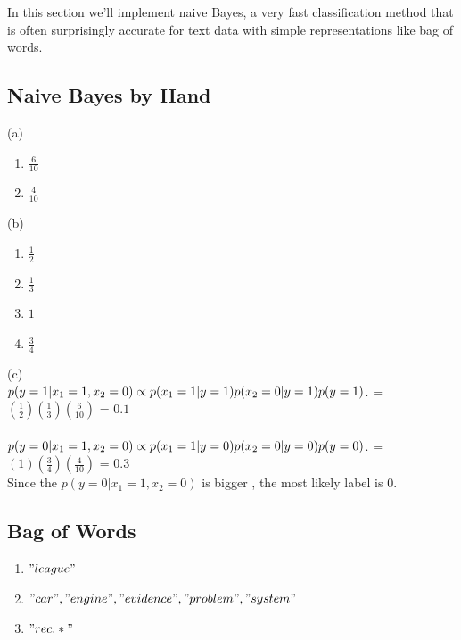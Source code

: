 \documentclass{article}
\begin{document}
In this section we'll implement naive Bayes, a very fast classification method that is often surprisingly accurate for text data with simple representations like bag of words.



\subsection{Naive Bayes by Hand}

(a)
\begin{enumerate}
\item  $\frac{6}{10}$
\item  $\frac{4}{10}$
\end{enumerate}

(b)
\begin{enumerate}
\item  $\frac{1}{2}$
\item  $\frac{1}{3}$
\item  $1$
\item  $\frac{3}{4}$
\end{enumerate}

(c)\\
$p( y = 1 |  x_1 = 1 , x_2 = 0 )
    \\ \propto p(  x_1 = 1  | y = 1 ) p(  x_2 = 0  | y = 1 ) p( y =1)$.
    \newline = $ (\frac{1}{2}) (\frac{1}{3})(\frac{6}{10}) $
    \newline = $0.1$
\\\\
$p( y = 0 |  x_1 = 1 , x_2 = 0 )
        \\\propto p(  x_1 = 1  | y = 0 ) p(  x_2 = 0  | y = 0 ) p( y =0)$.
        \newline =$ (1) (\frac{3}{4})(\frac{4}{10}) $
        \newline = $0.3$
\newline
\\Since the $p( y = 0 |  x_1 = 1 , x_2 = 0 ) $ is bigger , the most likely label is 0.


\subsection{Bag of Words}

\begin{enumerate}
\item  $"league"$
\item  $"car", "engine", "evidence", "problem", "system"$
\item $"rec.*"$

\end{enumerate}
\end{document}

